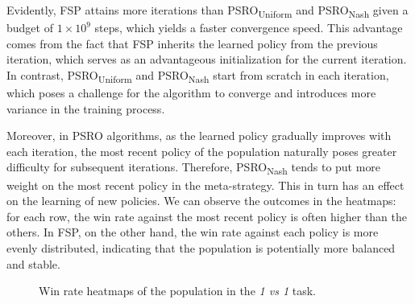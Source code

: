 Evidently, FSP attains more iterations than PSRO\textsubscript{Uniform} and PSRO\textsubscript{Nash} given a budget of $1\times10^9$ steps, which yields a faster convergence speed. This advantage comes from the fact that FSP inherits the learned policy from the previous iteration, which serves as an advantageous initialization for the current iteration. In contrast, PSRO\textsubscript{Uniform} and PSRO\textsubscript{Nash} start from scratch in each iteration, which poses a challenge for the algorithm to converge and introduces more variance in the training process.

Moreover, in PSRO algorithms, as the learned policy gradually improves with each iteration, the most recent policy of the population naturally poses greater difficulty for subsequent iterations. Therefore, PSRO\textsubscript{Nash} tends to put more weight on the most recent policy in the meta-strategy. 
This in turn has an effect on the learning of new policies. We can observe the outcomes in the heatmaps: for each row, the win rate against the most recent policy is often higher than the others. In FSP, on the other hand, the win rate against each policy is more evenly distributed, indicating that the population is potentially more balanced and stable.


\begin{figure}[t]
    \centering
    \caption{Win rate heatmaps of the population in the \textit{1 vs 1} task.}
    \label{fig:1v1heatmap}
\end{figure}

